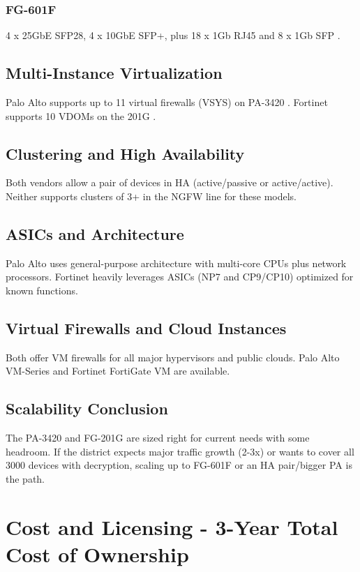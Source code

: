 \documentclass[12pt]{article}
\begin{document}
\subsubsection{FG-601F}
4 x 25GbE SFP28, 4 x 10GbE SFP+, plus 18 x 1Gb RJ45 and 8 x 1Gb SFP \cite{fortigate600fpdfseries}.

\subsection{Multi-Instance Virtualization}

Palo Alto supports up to 11 virtual firewalls (VSYS) on PA-3420 \cite{pa3400datasheet}. Fortinet supports 10 VDOMs on the 201G \cite{fortigate201gavfirewalls}.

\subsection{Clustering and High Availability}

Both vendors allow a pair of devices in HA (active/passive or active/active). Neither supports clusters of 3+ in the NGFW line for these models.

\subsection{ASICs and Architecture}

Palo Alto uses general-purpose architecture with multi-core CPUs plus network processors. Fortinet heavily leverages ASICs (NP7 and CP9/CP10) optimized for known functions.

\subsection{Virtual Firewalls and Cloud Instances}

Both offer VM firewalls for all major hypervisors and public clouds. Palo Alto VM-Series and Fortinet FortiGate VM are available.

\subsection{Scalability Conclusion}

The PA-3420 and FG-201G are sized right for current needs with some headroom. If the district expects major traffic growth (2-3x) or wants to cover all 3000 devices with decryption, scaling up to FG-601F or an HA pair/bigger PA is the path.

\section{Cost and Licensing - 3-Year Total Cost of Ownership}
\end{document}
